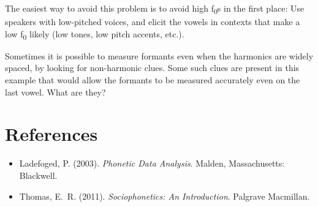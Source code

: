 \documentclass[12pt]{article}
\begin{document}
\begin{figure}[h!]
\centering
{}
\end{figure}

The easiest way to avoid this problem is to avoid high f\textsubscript{0}s in the first place: Use speakers with low-pitched voices, and elicit the vowels in contexts that make a low f\textsubscript{0} likely (low tones, low pitch accents, etc.).

Sometimes it is possible to measure formants even when the harmonics are widely spaced, by looking for non-harmonic clues. Some such clues are present in this example that would allow the formants to be measured accurately even on the last vowel. What are they?

\section*{References}

\begin{itemize}[leftmargin=1.5em]
    \item Ladefoged, P. (2003). \textit{Phonetic Data Analysis}. Malden, Massachusetts: Blackwell.
    \item Thomas, E.~R. (2011). \textit{Sociophonetics: An Introduction}. Palgrave Macmillan.
\end{itemize}
\end{document}
